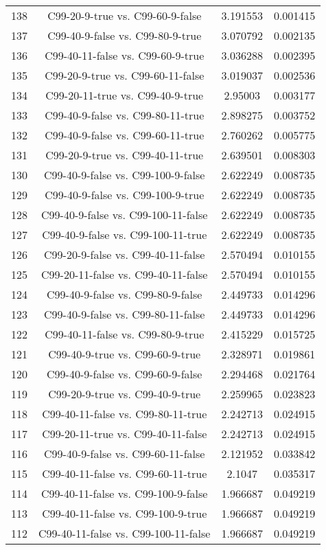 \documentclass[a4paper,10pt]{article}
\begin{document}
\begin{landscape}
\begin{table}[!htp]
\begin{tabular}{cccc}
138&C99-20-9-true vs. C99-60-9-false&3.191553&0.001415\\
137&C99-40-9-false vs. C99-80-9-true&3.070792&0.002135\\
136&C99-40-11-false vs. C99-60-9-true&3.036288&0.002395\\
135&C99-20-9-true vs. C99-60-11-false&3.019037&0.002536\\
134&C99-20-11-true vs. C99-40-9-true&2.95003&0.003177\\
133&C99-40-9-false vs. C99-80-11-true&2.898275&0.003752\\
132&C99-40-9-false vs. C99-60-11-true&2.760262&0.005775\\
131&C99-20-9-true vs. C99-40-11-true&2.639501&0.008303\\
130&C99-40-9-false vs. C99-100-9-false&2.622249&0.008735\\
129&C99-40-9-false vs. C99-100-9-true&2.622249&0.008735\\
128&C99-40-9-false vs. C99-100-11-false&2.622249&0.008735\\
127&C99-40-9-false vs. C99-100-11-true&2.622249&0.008735\\
126&C99-20-9-false vs. C99-40-11-false&2.570494&0.010155\\
125&C99-20-11-false vs. C99-40-11-false&2.570494&0.010155\\
124&C99-40-9-false vs. C99-80-9-false&2.449733&0.014296\\
123&C99-40-9-false vs. C99-80-11-false&2.449733&0.014296\\
122&C99-40-11-false vs. C99-80-9-true&2.415229&0.015725\\
121&C99-40-9-true vs. C99-60-9-true&2.328971&0.019861\\
120&C99-40-9-false vs. C99-60-9-false&2.294468&0.021764\\
119&C99-20-9-true vs. C99-40-9-true&2.259965&0.023823\\
118&C99-40-11-false vs. C99-80-11-true&2.242713&0.024915\\
117&C99-20-11-true vs. C99-40-11-false&2.242713&0.024915\\
116&C99-40-9-false vs. C99-60-11-false&2.121952&0.033842\\
115&C99-40-11-false vs. C99-60-11-true&2.1047&0.035317\\
114&C99-40-11-false vs. C99-100-9-false&1.966687&0.049219\\
113&C99-40-11-false vs. C99-100-9-true&1.966687&0.049219\\
112&C99-40-11-false vs. C99-100-11-false&1.966687&0.049219\\

\end{tabular}
\end{table}
\end{landscape}
\end{document}
